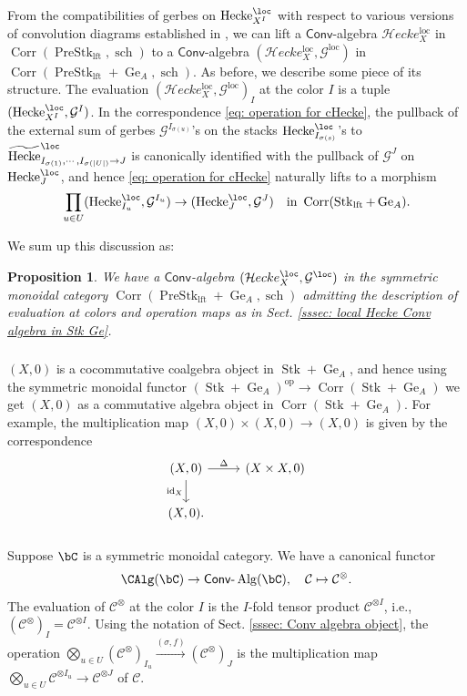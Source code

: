 \documentclass[10pt]{amsart}
\newcommand{\sssec}{\subsubsection}
\newtheorem{prop}[subsubsection]{Proposition}
\theoremstyle{remark}
\newcommand{\te}{\text}
\newcommand{\wt}{\widetilde}
\newcommand{\on}{\operatorname}
\newcommand{\cC}{\mathcal{C}}
\newcommand{\cG}{\mathcal{G}}
\newcommand{\lAlg}{\text{-}\on{Alg}}
\newcommand{\PreStklft}{\on{PreStk}_{\on{lft}}}
\newcommand{\Stk}{\on{Stk}}
\newcommand{\Stklft}{\on{Stk}_{\on{lft}}}
\DeclareMathOperator{\op}{op}
\newcommand{\id}{\on{id}}
\newcommand{\Hecke}{\on{Hecke}}
\newcommand{\Conv}{\mathsf{Conv}}
\newcommand{\cHecke}{\mathcal{H}ecke}
\newcommand{\Corr}{\on{Corr}}
\begin{document}
\sssec{}
From the compatibilities of gerbes on $\Hecke^{\loc}_{X^I}$ with respect to various versions of convolution diagrams established in \cite{ZhaoNew}, we can lift a $\Conv$-algebra $\cHecke^{\on{loc}}_X$ in $\Corr(\PreStklft, \on{sch})$ to a $\Conv$-algebra $(\cHecke^{\on{loc}}_X,\cG^{\on{loc}})$ in $\Corr(\PreStklft+\on{Ge}_A, \on{sch})$. As before, we describe some piece of its structure.
The evaluation $(\cHecke^{\on{loc}}_X,\cG^{\on{loc}})_I$ at the color $I$ is a tuple $(\Hecke^{\loc}_{X^I},\cG^I)$. In the correspondence \eqref{eq: operation for cHecke}, the pullback of the external sum of gerbes $\cG^{I_{\sigma(u)}}$'s on the stacks $\Hecke^{\loc}_{I_{\sigma(s)}}$'s to $\wt{\Hecke}^{\loc}_{I_{\sigma(1)},\cdots,I_{\sigma(|U|)}\rightarrow J}$ is canonically identified with the pullback of $\cG^{J}$ on $\Hecke^{\loc}_J$, and hence \eqref{eq: operation for cHecke} naturally lifts to a morphism
\[\prod_{u\in U}(\Hecke^{\loc}_{{I_u}},\cG^{I_u})\rightarrow (\Hecke^{\loc}_{J},\cG^J) \quad \te{in } \Corr(\Stklft+\on{Ge}_A).\]

We sum up this discussion as:

\begin{prop}
    We have a $\Conv$-algebra $(\cHecke^{\loc}_X,\cG^{\loc})$ in the symmetric monoidal category $\Corr(\PreStklft+\on{Ge}_A, \on{sch})$ admitting the description of evaluation at colors and operation maps as in Sect. \ref{sssec: local Hecke Conv algebra in Stk Ge}.
\end{prop}


\sssec{}
$(X,0)$ is a cocommutative coalgebra object in $\Stk+\on{Ge}_A$, and hence using the symmetric monoidal functor $(\Stk+\on{Ge}_A)^{\op}\rightarrow \Corr(\Stk+\on{Ge}_A)$ we get $(X,0)$ as a commutative algebra object in $\Corr(\Stk+\on{Ge}_A)$. For example, the multiplication map $(X,0)\times (X,0)\rightarrow (X,0)$ is given by the correspondence
\[\begin{tikzcd}
	(X,0) & {(X\times X,0)} \\
	(X,0).
	\arrow["\Delta", from=1-1, to=1-2]
	\arrow["{\id_X}"', from=1-1, to=2-1]
\end{tikzcd}\]

\sssec{}\label{sssec: Conv from E infty}
Suppose $\bC$ is a symmetric monoidal category. We have a canonical functor
\[\CAlg(\bC)\rightarrow \Conv\lAlg(\bC),\quad \cC\mapsto \cC^{\otimes}.\]
The evaluation of $\cC^{\otimes}$ at the color $I$ is the $I$-fold tensor product $\cC^{\otimes I}$, i.e., $(\cC^{\otimes})_I=\cC^{\otimes I}$. Using the notation of Sect. \ref{sssec: Conv algebra object}, the operation $\bigotimes_{u\in U}(\cC^{\otimes})_{I_u}\xrightarrow{(\sigma,f)}(\cC^{\otimes})_J$ is the multiplication map $\bigotimes_{u\in U}\cC^{\otimes I_u}\rightarrow\cC^{\otimes J}$ of $\cC$.
\medskip
\end{document}
